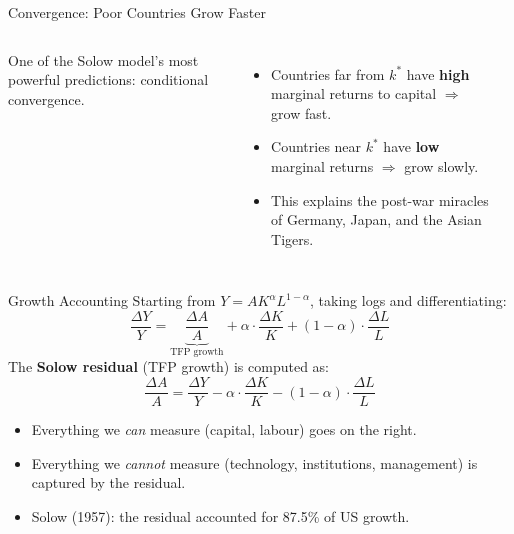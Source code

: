 \documentclass[aspectratio=169, 10pt]{beamer}
\begin{document}
\begin{frame}{Convergence: Poor Countries Grow Faster}
\begin{columns}[T]
One of the Solow model's most powerful predictions:
\alert{conditional convergence}.
\vspace{0.5em}
\begin{itemize}
  \item Countries far from $k^*$ have \textbf{high} marginal returns
        to capital $\Rightarrow$ grow fast.
  \item Countries near $k^*$ have \textbf{low} marginal returns
        $\Rightarrow$ grow slowly.
  \item This explains the post-war miracles of Germany,
        Japan, and the Asian Tigers.
\end{itemize}
\begin{center}
\end{center}
\end{columns}
\end{frame}

\begin{frame}{Growth Accounting}
Starting from $Y = A K^{\alpha} L^{1-\alpha}$, taking logs and
differentiating:
\[
  \frac{\Delta Y}{Y}
  = \underbrace{\frac{\Delta A}{A}}_{\text{TFP growth}}
  + \alpha \cdot \frac{\Delta K}{K}
  + (1-\alpha) \cdot \frac{\Delta L}{L}
\]
\vspace{0.3em}
The \textbf{Solow residual} (TFP growth) is computed as:
\[
  \frac{\Delta A}{A}
  = \frac{\Delta Y}{Y}
    - \alpha \cdot \frac{\Delta K}{K}
    - (1-\alpha) \cdot \frac{\Delta L}{L}
\]
\vspace{0.3em}
\begin{itemize}
  \item Everything we \textit{can} measure (capital, labour) goes on the right.
  \item Everything we \textit{cannot} measure (technology, institutions,
        management) is captured by the residual.
  \item Solow (1957): the residual accounted for \alert{87.5\%} of US growth.
\end{itemize}
\end{frame}
\end{document}
